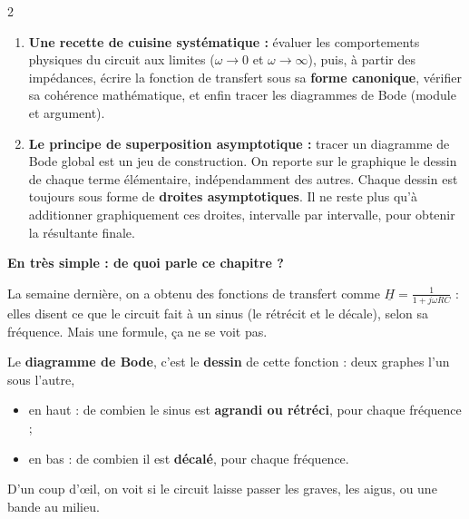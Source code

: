 \documentclass[a4paper,9pt]{extarticle}
\begin{document}
\begin{multicols}{2}
\begin{summary}
\begin{enumerate}[leftmargin=*,itemsep=1pt,topsep=1pt]
\item \textbf{Une recette de cuisine systématique :} évaluer les comportements physiques du circuit aux limites ($\omega \to 0$ et $\omega \to \infty$), puis, à partir des impédances, écrire la fonction de transfert sous sa \textbf{forme canonique}, vérifier sa cohérence mathématique, et enfin tracer les diagrammes de Bode (module et argument).

\item \textbf{Le principe de superposition asymptotique :} tracer un diagramme de Bode global est un \og jeu \fg{} de construction. On reporte sur le graphique le dessin de chaque terme élémentaire, indépendamment des autres. Chaque dessin est toujours sous forme de \textbf{droites asymptotiques}. Il ne reste plus qu'à additionner graphiquement ces droites, intervalle par intervalle, pour obtenir la résultante finale.

\end{enumerate}

\end{summary}


\begin{important}

\textbf{En très simple : de quoi parle ce chapitre ?}

La semaine dernière, on a obtenu des fonctions de transfert comme $\underline{H} = \frac{1}{1 + j\omega RC}$ : elles disent ce que le circuit fait à un sinus (le rétrécit et le décale), selon sa fréquence. Mais une formule, ça ne se \og voit \fg{} pas.

\vspace{3pt}

Le \textbf{diagramme de Bode}, c'est le \textbf{dessin} de cette fonction : deux graphes l'un sous l'autre,

\begin{itemize}

\item en haut : de combien le sinus est \textbf{agrandi ou rétréci}, pour chaque fréquence ;

\item en bas : de combien il est \textbf{décalé}, pour chaque fréquence.

\end{itemize}

D'un coup d'œil, on voit si le circuit laisse passer les graves, les aigus, ou une bande au milieu.

\vspace{3pt}


\end{important}
\end{multicols}
\end{document}
